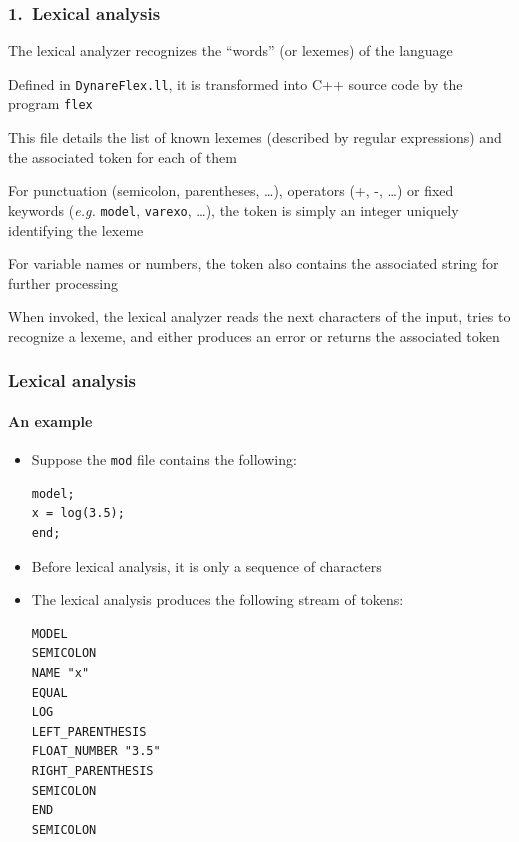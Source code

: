 \documentclass[aspectratio=169]{beamer}
\newenvironment{witemize}{\itemize\addtolength{\itemsep}{8pt}}{\enditemize}
\begin{document}
\begin{frame}
\frametitle{1.\ Lexical analysis}
\begin{witemize}
\item The lexical analyzer recognizes the ``words'' (or \alert{lexemes}) of the language
\item Defined in \texttt{DynareFlex.ll}, it is transformed into C++ source code by the program \texttt{flex}
\item This file details the list of known lexemes (described by regular expressions) and the associated \alert{token} for each of them
\item For punctuation (semicolon, parentheses, \ldots), operators (+, -, \ldots) or fixed keywords (\textit{e.g.} \texttt{model}, \texttt{varexo}, \ldots), the token is simply an integer uniquely identifying the lexeme
\item For variable names or numbers, the token also contains the associated string for further processing
\item When invoked, the lexical analyzer reads the next characters of the input, tries to recognize a lexeme, and either produces an error or returns the associated token
\end{witemize}
\end{frame}

\begin{frame}[fragile]
\frametitle{Lexical analysis}
\framesubtitle{An example}
\begin{itemize}
\item Suppose the \texttt{mod} file contains the following:
\begin{verbatim}
model;
x = log(3.5);
end;
\end{verbatim}
\item Before lexical analysis, it is only a sequence of characters
\item The lexical analysis produces the following stream of tokens:

\begin{footnotesize}
\begin{verbatim}
MODEL
SEMICOLON
NAME "x"
EQUAL
LOG
LEFT_PARENTHESIS
FLOAT_NUMBER "3.5"
RIGHT_PARENTHESIS
SEMICOLON
END
SEMICOLON
\end{verbatim}
\end{footnotesize}
\end{itemize}
\end{frame}
\end{document}
